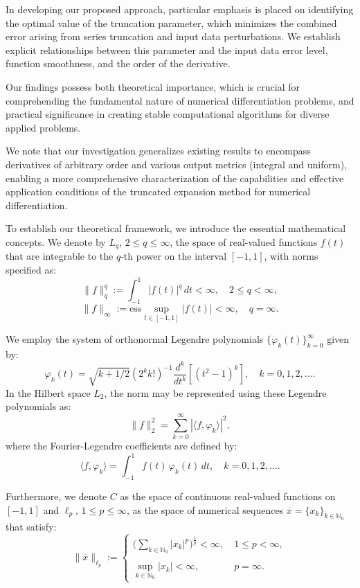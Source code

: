 \documentclass[10pt]{extarticle}
\begin{document}
In developing our proposed approach, particular emphasis is placed on identifying the optimal value of 
the truncation parameter, which minimizes the combined error arising from series truncation and input data perturbations. 
We establish explicit relationships between this parameter and the input data error level, function smoothness, 
and the order of the derivative.

Our findings possess both theoretical importance, which is crucial for comprehending the fundamental nature 
of numerical differentiation problems, and practical significance in creating stable computational algorithms 
for diverse applied problems.

We note that our investigation generalizes existing results to encompass derivatives of arbitrary order and 
various output metrics (integral and uniform), enabling a more comprehensive characterization of the capabilities 
and effective application conditions of the truncated expansion method for numerical differentiation.

To establish our theoretical framework, we introduce the essential mathematical concepts.
We denote by $L_{q}$, $2\le q\le \infty$, the space of real-valued functions $f(t)$
that are integrable to the $q$-th power on the interval $[-1, 1]$,
with norms specified as:
$$
\|f\|_{q}^q := \int_{-1}^1 |f(t)|^q \, d t < \infty ,
\quad 2 \le q < \infty,
$$
$$
\|f\|_{\infty}:=
\mbox{ess}  \sup\limits_{\! \! \! \! \! \! \! \! \! \! \! \! \! t \in [-1, 1]} |f(t)| < \infty ,
\quad q = \infty .
$$

We employ the system of orthonormal Legendre polynomials $\{\varphi_k(t)\}_{k=0}^\infty$ given by:
$$
\varphi_k(t) = \sqrt{k + 1/2}(2^k k!)^{-1} \frac{d^k}{dt^k}[(t^2 - 1)^k], \quad k = 0,1,2,\dots .
$$
In the Hilbert space $L_{2}$, the norm may be represented using these Legendre polynomials as:
$$
\|f\|_2^2 = \sum_{k=0}^{\infty}|\langle f, \varphi_k \rangle|^2 ,
$$
where the Fourier-Legendre coefficients are defined by:
$$
\langle f, \varphi_k\rangle=\int_{-1}^{1} f (t)\, \varphi_k(t)\, dt,
\quad k=0,1,2,\ldots .
$$

Furthermore, we denote $C$ as the space of continuous real-valued functions on $[-1,1]$
and $\ell_p$, $1\leq p\leq\infty$, as the space of numerical sequences
$\overline{x}=\{x_{k}\}_{k\in\mathbb{N}_0}$ that satisfy:
$$
\|\overline{x}\|_{\ell_p}  := \left\{
\begin{array}{cl}
\bigg(\sum\limits_{k\in\mathbb{N}_0} |x_{k}|^p\bigg)^{\frac{1}{p}} < \infty ,
 \ & 1\leq p<\infty ,
\\\\
\sup\limits_{k\in\mathbb{N}_0}  |x_{k}| < \infty ,
  \ & p=\infty .
\end{array}
\right.
$$
\end{document}
